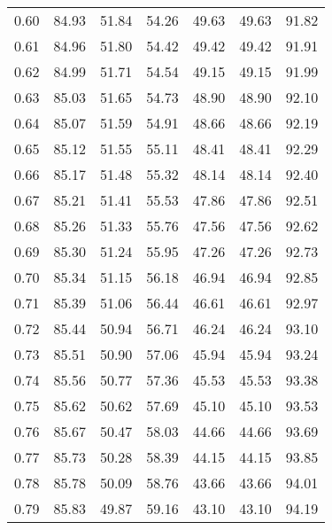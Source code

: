 \begin{tabular}{|c|c|c|c|c|c|c|}
      0.60 &     84.93 &     51.84 &      54.26 &   49.63 &      49.63 &         91.82 \\
      0.61 &     84.96 &     51.80 &      54.42 &   49.42 &      49.42 &         91.91 \\
      0.62 &     84.99 &     51.71 &      54.54 &   49.15 &      49.15 &         91.99 \\
      0.63 &     85.03 &     51.65 &      54.73 &   48.90 &      48.90 &         92.10 \\
      0.64 &     85.07 &     51.59 &      54.91 &   48.66 &      48.66 &         92.19 \\
      0.65 &     85.12 &     51.55 &      55.11 &   48.41 &      48.41 &         92.29 \\
      0.66 &     85.17 &     51.48 &      55.32 &   48.14 &      48.14 &         92.40 \\
      0.67 &     85.21 &     51.41 &      55.53 &   47.86 &      47.86 &         92.51 \\
      0.68 &     85.26 &     51.33 &      55.76 &   47.56 &      47.56 &         92.62 \\
      0.69 &     85.30 &     51.24 &      55.95 &   47.26 &      47.26 &         92.73 \\
      0.70 &     85.34 &     51.15 &      56.18 &   46.94 &      46.94 &         92.85 \\
      0.71 &     85.39 &     51.06 &      56.44 &   46.61 &      46.61 &         92.97 \\
      0.72 &     85.44 &     50.94 &      56.71 &   46.24 &      46.24 &         93.10 \\
      0.73 &     85.51 &     50.90 &      57.06 &   45.94 &      45.94 &         93.24 \\
      0.74 &     85.56 &     50.77 &      57.36 &   45.53 &      45.53 &         93.38 \\
      0.75 &     85.62 &     50.62 &      57.69 &   45.10 &      45.10 &         93.53 \\
      0.76 &     85.67 &     50.47 &      58.03 &   44.66 &      44.66 &         93.69 \\
      0.77 &     85.73 &     50.28 &      58.39 &   44.15 &      44.15 &         93.85 \\
      0.78 &     85.78 &     50.09 &      58.76 &   43.66 &      43.66 &         94.01 \\
      0.79 &     85.83 &     49.87 &      59.16 &   43.10 &      43.10 &         94.19 \\

\end{tabular}
